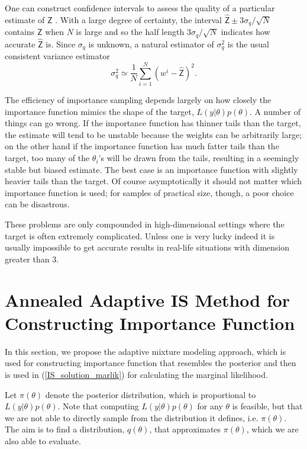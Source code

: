 \documentclass[aoas]{imsart}
\def\Z{\textsf{Z}}
\begin{document}
One can construct confidence intervals to assess the quality of a
particular estimate of $\Z$ \citep{lefebvre2009path}. With a large
degree of certainty, the interval $\hat{\Z}\pm3\sigma_q/\sqrt{N}$
contains $\Z$ when $N$ is large and so the half length
$3\sigma_q/\sqrt{N}$ indicates how accurate $\hat{\Z}$ is. Since
$\sigma_q$ is unknown, a natural estimator of $\sigma_q^2$ is the
usual consistent variance estimator
\begin{equation}
\sigma_q^2\simeq\frac{1}{N}\sum\limits_{i=1}^N\left(w^i-\hat{\Z}\right)^2.
\end{equation}

The efficiency of importance sampling depends largely on how closely
the importance function mimics the shape of the target,
$L(y|\theta)p(\theta)$. A number of things can go wrong. If the
importance function has thinner tails than the target, the estimate
will tend to be unstable because the weights can be arbitrarily
large; on the other hand if the importance function has much fatter
tails than the target, too many of the $\theta_i$'s will be drawn
from the tails, resulting in a seemingly stable but biased estimate.
The best case is an importance function with slightly heavier tails
than the target. Of course asymptotically it should not matter which
importance function is used; for samples of practical size, though,
a poor choice can be disastrous.

These problems are only compounded in high-dimensional settings
where the target is often extremely complicated. Unless one is very
lucky indeed it is usually impossible to get accurate results in
real-life situations with dimension greater than 3.

\section{Annealed Adaptive IS Method for Constructing Importance
  Function} \label{sec:AAIS}
In this section, we propose the adaptive mixture modeling approach,
which is used for constructing importance function that resembles
the posterior and then is used in (\ref{IS_solution_marlik}) for
calculating the marginal likelihood.

Let $\pi(\theta)$ denote the posterior distribution, which is
proportional to $L(y|\theta)p(\theta)$. Note that computing
$L(y|\theta)p(\theta)$ for any $\theta$ is feasible, but that we are
not able to directly sample from the distribution it defines, i.e.
$\pi(\theta)$. The aim is to find a distribution, $q(\theta)$, that
approximates $\pi(\theta)$, which we are also able to evaluate.
\end{document}
